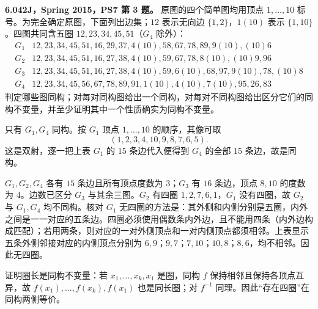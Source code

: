 \begin{exercise}\label{mit:6042-ps7-q3}
\textbf{6.042J，Spring 2015，PS7 第 3 题。}
原图的四个简单图均用顶点 $1,\ldots,10$ 标号。为完全确定原图，下面列出边集；$12$ 表示无向边 $\{1,2\}$，$1(10)$ 表示 $\{1,10\}$。四图共同含五圈 $12,23,34,45,51$（$G_4$ 除外）：
\[
\begin{array}{c|l}
G_1&12,23,34,45,51,16,29,37,4(10),58,67,78,89,9(10),(10)6\\
G_2&12,23,34,45,51,16,27,38,4(10),59,67,78,8(10),(10)9,96\\
G_3&12,23,34,45,51,16,27,38,4(10),59,6(10),68,97,9(10),78,(10)8\\
G_4&12,23,34,45,56,67,78,89,91,1(10),4(10),7(10),95,26,83
\end{array}
\]
判定哪些图同构；对每对同构图给出一个同构，对每对不同构图给出区分它们的同构不变量，并至少证明其中一个性质确实为同构不变量。
\end{exercise}
\begin{solution}
只有 $G_1,G_4$ 同构。按 $G_1$ 顶点 $1,\ldots,10$ 的顺序，其像可取
\[
(1,2,3,4,10,9,8,7,6,5).
\]
这是双射，逐一把上表 $G_1$ 的 $15$ 条边代入便得到 $G_4$ 的全部 $15$ 条边，故是同构。

$G_1,G_2,G_4$ 各有 $15$ 条边且所有顶点度数为 $3$；$G_3$ 有 $16$ 条边，顶点 $8,10$ 的度数为 $4$。边数已区分 $G_3$ 与其余三图。$G_2$ 有四圈 $1,2,7,6,1$，$G_1$ 没有四圈，故 $G_2$ 与 $G_1,G_4$ 均不同构。核对 $G_1$ 无四圈的方法是：其外侧和内侧分别是五圈，内外之间是一一对应的五条边。四圈必须使用偶数条内外边，且不能用四条（内外边构成匹配）；若用两条，则对应的一对外侧顶点和一对内侧顶点都须相邻。上表显示五条外侧邻接对应的内侧顶点分别为 $6,9$；$9,7$；$7,10$；$10,8$；$8,6$，均不相邻。因此无四圈。

证明圈长是同构不变量：若 $x_1,\ldots,x_k,x_1$ 是圈，同构 $f$ 保持相邻且保持各顶点互异，故 $f(x_1),\ldots,f(x_k),f(x_1)$ 也是同长圈；对 $f^{-1}$ 同理。因此“存在四圈”在同构两侧等价。
\end{solution}

